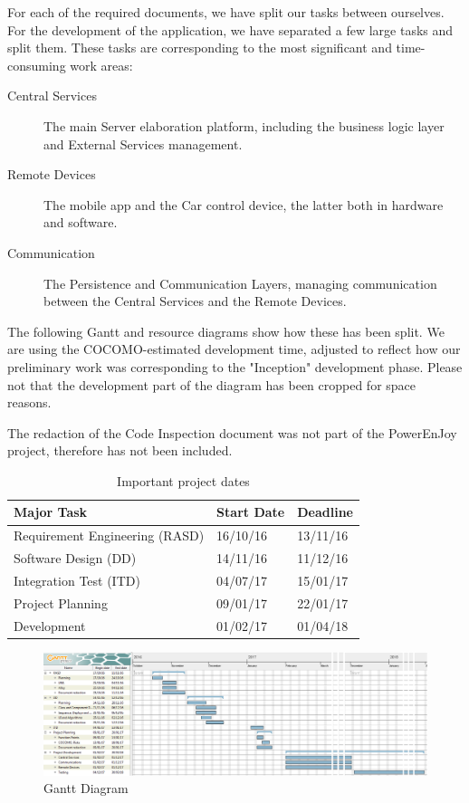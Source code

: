 For each of the required documents, we have split our tasks between ourselves. For the development of the application, we have separated a few large tasks and split them. These tasks are corresponding to the most significant and time-consuming work areas:

\begin{description}
	\item[Central Services] The main Server elaboration platform, including the business logic layer and External Services management.
	\item[Remote Devices] The mobile app and the Car control device, the latter both in hardware and software.
	\item[Communication] The Persistence and Communication Layers, managing communication between the Central Services and the Remote Devices.
\end{description}

The following Gantt and resource diagrams show how these has been split. We are using the COCOMO-estimated development time, adjusted to reflect how our preliminary work was corresponding to the "Inception" development phase. Please not that the development part of the diagram has been cropped for space reasons.

The redaction of the Code Inspection document was not part of the PowerEnJoy project, therefore has not been included.
\\
\begin{table}[h]
\centering
\begin{tabular}{l|l|l}	
	\textbf{Major Task} & \textbf{Start Date} & \textbf{Deadline} \\ \hline
	Requirement Engineering (RASD) & 16/10/16 & 13/11/16 \\ \hline
	Software Design (DD) & 14/11/16 & 11/12/16 \\ \hline
	Integration Test (ITD) & 04/07/17 & 15/01/17 \\ \hline
	Project Planning & 09/01/17 & 22/01/17 \\ \hline
	Development & 01/02/17 & 01/04/18 \\	
\end{tabular}
\caption{Important project dates}
\end{table}

\begin{figure}[h]
	\centering
	\includegraphics[width=\textwidth]{Images/GANTT}
	\caption{Gantt Diagram}
\end{figure}

